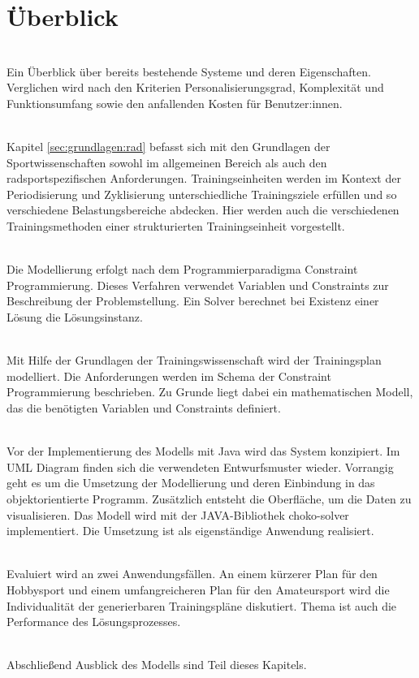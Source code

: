 \section{Überblick}
\label{sec:intro:ueberblick}
\textbf{} \\[0.2em]
Ein Überblick über bereits bestehende Systeme und deren Eigenschaften. Verglichen wird nach den Kriterien Personalisierungsgrad, Komplexität und Funktionsumfang sowie den anfallenden Kosten für Benutzer:innen.

\textbf{} \\[0.2em]
Kapitel \ref{sec:grundlagen:rad} befasst sich mit den Grundlagen der Sportwissenschaften sowohl im allgemeinen Bereich als auch den radsportspezifischen Anforderungen. Trainingseinheiten werden im Kontext der Periodisierung und Zyklisierung unterschiedliche Trainingsziele erfüllen und so verschiedene Belastungsbereiche abdecken. Hier werden auch die verschiedenen Trainingsmethoden einer strukturierten Trainingseinheit vorgestellt.

\textbf{} \\[0.2em]
Die Modellierung erfolgt nach dem Programmierparadigma Constraint Programmierung. Dieses Verfahren verwendet Variablen und Constraints zur Beschreibung der Problemstellung. Ein Solver berechnet bei Existenz einer Lösung die Lösungsinstanz. 

\textbf{} \\[0.2em]
Mit Hilfe der Grundlagen der Trainingswissenschaft wird der Trainingsplan modelliert. Die Anforderungen werden im Schema der Constraint Programmierung beschrieben. Zu Grunde liegt dabei ein mathematischen Modell, das die benötigten Variablen und Constraints definiert.

\textbf{} \\[0.2em]
Vor der Implementierung des Modells mit Java wird das System konzipiert. Im UML Diagram finden sich die verwendeten Entwurfsmuster wieder. Vorrangig geht es um die Umsetzung der Modellierung und deren Einbindung in das objektorientierte Programm. Zusätzlich entsteht die Oberfläche, um die Daten zu visualisieren. Das Modell wird mit der JAVA-Bibliothek choko-solver implementiert. Die Umsetzung ist als eigenständige Anwendung realisiert. 

\textbf{} \\[0.2em]
Evaluiert wird an zwei Anwendungsfällen. An einem kürzerer Plan für den Hobbysport und einem umfangreicheren Plan für den Amateursport wird die Individualität der generierbaren Trainingspläne diskutiert. Thema ist auch die Performance des Lösungsprozesses.

\textbf{} \\[0.2em]
Abschließend 
Ausblick  des Modells sind Teil dieses Kapitels. 